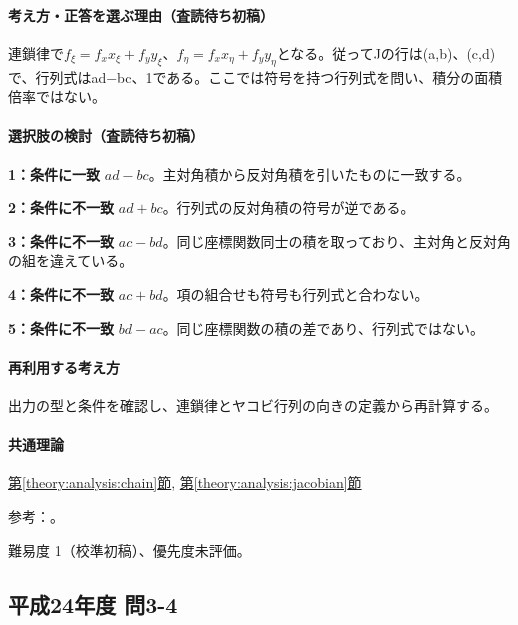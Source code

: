 \paragraph{考え方・正答を選ぶ理由（査読待ち初稿）} 連鎖律で\(f_\xi=f_xx_\xi+f_yy_\xi\)、\(f_\eta=f_xx_\eta+f_yy_\eta\)となる。従ってJの行は(a,b)、(c,d)で、行列式はad−bc、1である。ここでは符号を持つ行列式を問い、積分の面積倍率ではない。

\paragraph{選択肢の検討（査読待ち初稿）}\mbox{}\par

\noindent\textbf{1：条件に一致} \(ad-bc\)。主対角積から反対角積を引いたものに一致する。\par

\noindent\textbf{2：条件に不一致} \(ad+bc\)。行列式の反対角積の符号が逆である。\par

\noindent\textbf{3：条件に不一致} \(ac-bd\)。同じ座標関数同士の積を取っており、主対角と反対角の組を違えている。\par

\noindent\textbf{4：条件に不一致} \(ac+bd\)。項の組合せも符号も行列式と合わない。\par

\noindent\textbf{5：条件に不一致} \(bd-ac\)。同じ座標関数の積の差であり、行列式ではない。\par

\paragraph{再利用する考え方} 出力の型と条件を確認し、連鎖律とヤコビ行列の向きの定義から再計算する。

\paragraph{共通理論} \hyperref[theory:analysis:chain]{第\ref*{theory:analysis:chain}節}, \hyperref[theory:analysis:jacobian]{第\ref*{theory:analysis:jacobian}節}

\par 参考：\cite{mit_chain2007}。

\par 難易度 1（校準初稿）、優先度未評価。

\subsection{平成24年度 問3-4}
\label{q:h24-reg-basic-3-4}


